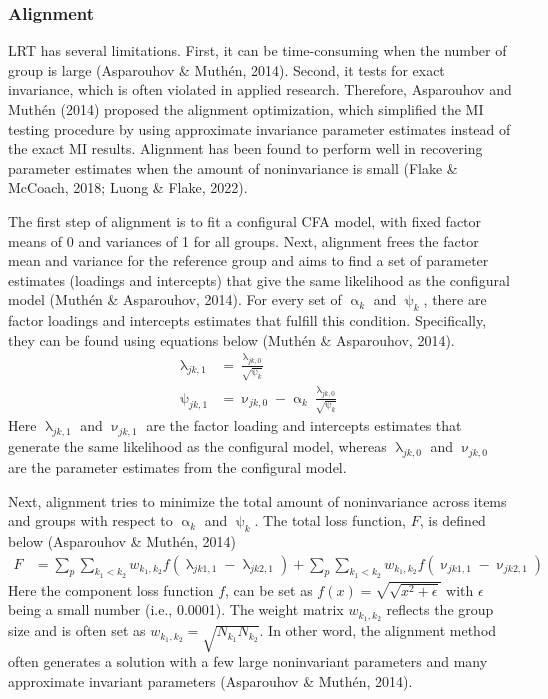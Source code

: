 \documentclass[
  man]{apa7}
\let\alpha\upalpha
\let\psi\uppsi
\let\nu\upnu
\begin{document}
\subsubsection{Alignment}\label{alignment}

LRT has several limitations. First, it can be time-consuming when the number of group is large (Asparouhov \& Muthén, 2014). Second, it tests for exact invariance, which is often violated in applied research. Therefore, Asparouhov and Muthén (2014) proposed the alignment optimization, which simplified the MI testing procedure by using approximate invariance parameter estimates instead of the exact MI results. Alignment has been found to perform well in recovering parameter estimates when the amount of noninvariance is small (Flake \& McCoach, 2018; Luong \& Flake, 2022).

The first step of alignment is to fit a configural CFA model, with fixed factor means of 0 and variances of 1 for all groups. Next, alignment frees the factor mean and variance for the reference group and aims to find a set of parameter estimates (loadings and intercepts) that give the same likelihood as the configural model (Muthén \& Asparouhov, 2014). For every set of \(\alpha_k\) and \(\psi_k\), there are factor loadings and intercepts estimates that fulfill this condition. Specifically, they can be found using equations below (Muthén \& Asparouhov, 2014).
\begin{align}
\uplambda_{jk,1} &= \frac{\uplambda_{jk,0}}{\sqrt{\psi_k}}\\
\psi_{jk,1} &= \nu_{jk,0} - \alpha_k \frac{\uplambda_{jk,0}}{\sqrt{\psi_k}}
\end{align}
Here \(\uplambda_{jk,1}\) and \(\nu_{jk,1}\) are the factor loading and intercepts estimates that generate the same likelihood as the configural model, whereas \(\uplambda_{jk,0}\) and \(\nu_{jk,0}\) are the parameter estimates from the configural model.

Next, alignment tries to minimize the total amount of noninvariance across items and groups with respect to \(\alpha_k\) and \(\psi_k\). The total loss function, \(F\), is defined below (Asparouhov \& Muthén, 2014)\\
\begin{align}
F &= \sum_p \sum_{k_1 < k_2}w_{k_1,k_2}f(\uplambda_{jk1,1} -\uplambda_{jk2,1}) + \sum_p \sum_{k_1 < k_2}w_{k_1,k_2}f(\nu_{jk1,1} -\nu_{jk2,1}) 
\end{align}
Here the component loss function \(f\), can be set as \(f(x) = \sqrt{\sqrt{x^2 + \epsilon}}\) with \(\epsilon\) being a small number (i.e., 0.0001). The weight matrix \(w_{k_1,k_2}\) reflects the group size and is often set as \(w_{k_1,k_2} = \sqrt{N_{k_1} N_{k_2}}\). In other word, the alignment method often generates a solution with a few large noninvariant parameters and many approximate invariant parameters (Asparouhov \& Muthén, 2014).
\end{document}
